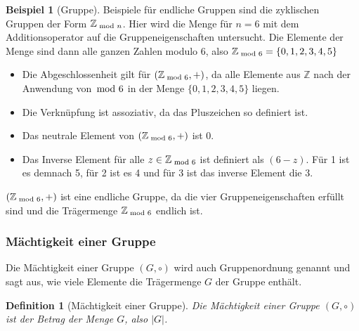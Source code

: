 \documentclass[12pt,a4paper, usenames, dvipsnames]{article}
\theoremstyle{mystyle}
\newtheorem{definition}{Definition}
\theoremstyle{definition}
\newtheorem{bsp}{Beispiel}[definition]
\begin{document}
\begin{bsp}[Gruppe]

Beispiele für endliche Gruppen sind die zyklischen Gruppen der Form $\mathbb{Z}_{\hspace*{-0.3em}\mod n}$. Hier wird die Menge für $n=6$ mit dem Additionsoperator auf die Gruppeneigenschaften untersucht. Die Elemente der Menge sind dann alle ganzen Zahlen modulo 6, also $\mathbb{Z}_{\hspace*{-0.3em}\mod 6}=\{0,1,2,3,4,5\}$
\begin{itemize}
\item Die Abgeschlossenheit gilt für $(\mathbb{Z}_{\hspace*{-0.3em}\mod 6}, +)$, da alle Elemente aus $\mathbb{Z}$ nach der Anwendung von $\hspace*{-0.5em} \mod 6$ in der Menge $\{0,1,2,3,4,5\}$ liegen.
\item Die Verknüpfung ist assoziativ, da das Pluszeichen so definiert ist.
\item Das neutrale Element von $(\mathbb{Z}_{\hspace*{-0.3em}\mod 6}, +)$ ist $0$.
\item Das Inverse Element für alle $z \in \mathbb{Z}_{\hspace*{-0.3em}\mod 6}$ ist definiert als $(6-z)$. Für 1 ist es demnach 5, für 2 ist es 4 und für 3 ist das inverse Element die 3.
\end{itemize}

$(\mathbb{Z}_{\hspace*{-0.3em}\mod 6}, +)$ ist eine endliche Gruppe, da die vier Gruppeneigenschaften erfüllt sind und die Trägermenge $\mathbb{Z}_{\hspace*{-0.3em}\mod 6}$ endlich ist.

\end{bsp}

\subsubsection*{Mächtigkeit einer Gruppe}

\label{Abschnitt_MächtigkeitGruppe}

Die Mächtigkeit einer Gruppe $(G, \circ)$ wird auch Gruppenordnung genannt und sagt aus, wie viele Elemente die Trägermenge $G$ der Gruppe enthält.

\begin{definition}[Mächtigkeit einer Gruppe]
Die Mächtigkeit einer Gruppe $(G, \circ)$ ist der Betrag der Menge $G$, also $|G|$. 
\end{definition}
\end{document}

